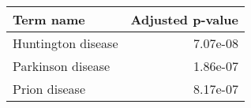 \begin{tabular}{lr}
\toprule
         Term name &  Adjusted p-value \\
\midrule
Huntington disease &          7.07e-08 \\
 Parkinson disease &          1.86e-07 \\
     Prion disease &          8.17e-07 \\
\bottomrule
\end{tabular}

